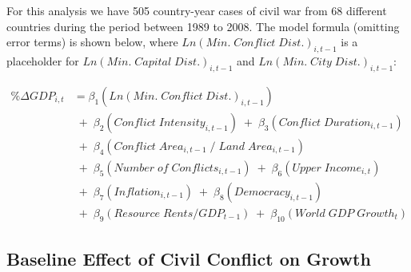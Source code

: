 For this analysis we have 505 country-year cases of civil war from 68 different countries during the period between 1989 to 2008. The model formula (omitting error terms) is shown below, where $Ln(Min. \; Conflict \; Dist.)_{i,t-1}$ is a placeholder for $Ln(Min. \; Capital \; Dist.)_{i,t-1}$ and $Ln(Min. \; City \; Dist.)_{i,t-1}$:

\begin{align*}
	\% \Delta GDP_{i,t} &= \beta_{1}(Ln(Min. \; Conflict \; Dist.)_{i,t-1}) \\
	& \;+\; \beta_{2}(Conflict \; Intensity_{i,t-1}) \;+\; \beta_{3}(Conflict \; Duration_{i,t-1}) \\
	& \;+\; \beta_{4}(Conflict \; Area_{i,t-1} \;/\; Land \; Area_{i,t-1}) \\
	& \;+\; \beta_{5}(Number \; of \; Conflicts_{i,t-1}) \;+\; \beta_{6}(Upper \; Income_{i,t}) \\	
	& \;+\; \beta_{7}(Inflation_{i,t-1}) \;+\; \beta_{8}(Democracy_{i,t-1}) \\
	& \;+\; \beta_{9}(Resource \; Rents/GDP_{t-1}) \;+\; \beta_{10}(World \; GDP \; Growth_{t})
\end{align*}

\subsection{Baseline Effect of Civil Conflict on Growth}

